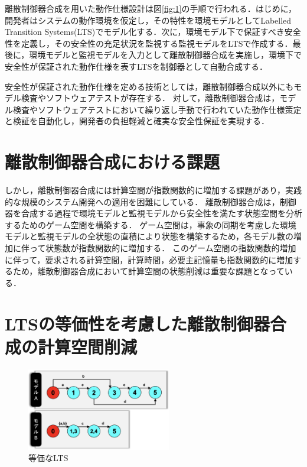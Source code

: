 \documentclass[11pt]{jarticle}
\begin{document}
離散制御器合成を用いた動作仕様設計は図\ref{fig:1}の手順で行われる\cite{concurrency}．はじめに，開発者はシステムの動作環境を仮定し，その特性を環境モデルとしてLabelled Transition Systems(LTS)でモデル化する．次に，環境モデル下で保証すべき安全性を定義し，その安全性の充足状況を監視する監視モデルをLTSで作成する．最後に，環境モデルと監視モデルを入力として離散制御器合成を実施し，環境下で安全性が保証された動作仕様を表すLTSを制御器として自動合成する．

安全性が保証された動作仕様を定める技術としては，離散制御器合成以外にもモデル検査やソフトウェアテストが存在する．
対して，離散制御器合成は，モデル検査やソフトウェアテストにおいて繰り返し手動で行われていた動作仕様策定と検証を自動化し，開発者の負担軽減と確実な安全性保証を実現する．


\section{離散制御器合成における課題}
しかし，離散制御器合成には計算空間が指数関数的に増加する課題があり，実践的な規模のシステム開発への適用を困難にしている．
離散制御器合成は，制御器を合成する過程で環境モデルと監視モデルから安全性を満たす状態空間を分析するためのゲーム空間を構築する．
ゲーム空間は，事象の同期を考慮した環境モデルと監視モデルの全状態の直積により状態を構築するため，各モデル数の増加に伴って状態数が指数関数的に増加する．
このゲーム空間の指数関数的増加に伴って，要求される計算空間，計算時間，必要主記憶量も指数関数的に増加するため，離散制御器合成において計算空間の状態削減は重要な課題となっている．


\section{LTSの等価性を考慮した離散制御器合成の計算空間削減}
\begin{figure}
  \centering
  \includegraphics[width=6.3cm]{./figures/minimise.png}
  \caption{等価なLTS}
  \label{fig:2}
\end{figure}
\end{document}

